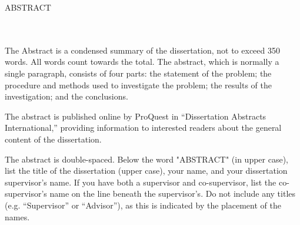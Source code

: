 \begin{center}
    ABSTRACT\\
    \thetitle\\
    \vspace{.5in}
    \theauthor\\
    \theadvisor
\end{center}

\doublespaced
\noindent

The Abstract is a condensed summary of the dissertation, not to exceed 350 words. All words count towards the total. The abstract, which is normally a single paragraph, consists of four parts: the statement of the problem; the procedure and methods used to investigate the problem; the results of the investigation; and the conclusions.

The abstract is published online by ProQuest in “Dissertation Abstracts International,” providing information to interested readers about the general content of the dissertation.

The abstract is double-spaced. Below the word "ABSTRACT" (in upper case), list the title of the dissertation (upper case), your name, and your dissertation supervisor's name. If you have both a supervisor and co-supervisor, list the co-supervisor’s name on the line beneath the supervisor’s. Do not include any titles (e.g. “Supervisor” or “Advisor”), as this is indicated by the placement of the names.
